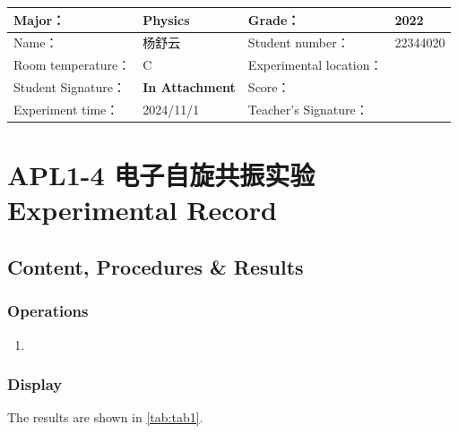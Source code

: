 
\begin{table}
	\renewcommand\arraystretch{1.7}
	\centering
	\begin{tabularx}{\textwidth}{|X|X|X|X|}
		\hline
		Major： & Physics & Grade： & 2022 \\
		\hline
		Name： & 杨舒云 & Student number： & 22344020\\
		\hline
		Room temperature： & \degree C & Experimental location： &  \\
		\hline
		Student Signature：& \textbf{In Attachment} & Score： &\\
		\hline
		Experiment time：& 2024/11/1 & Teacher's Signature：&\\
		\hline
	\end{tabularx}
\end{table}
\section{APL1-4 电子自旋共振实验 \\ Experimental Record}


\subsection{Content, Procedures \& Results}

\subsubsection{Operations}
\begin{enumerate}
	\item 
\end{enumerate}	

\subsubsection{Display}

The results are shown in \cref{tab:tab1}.

